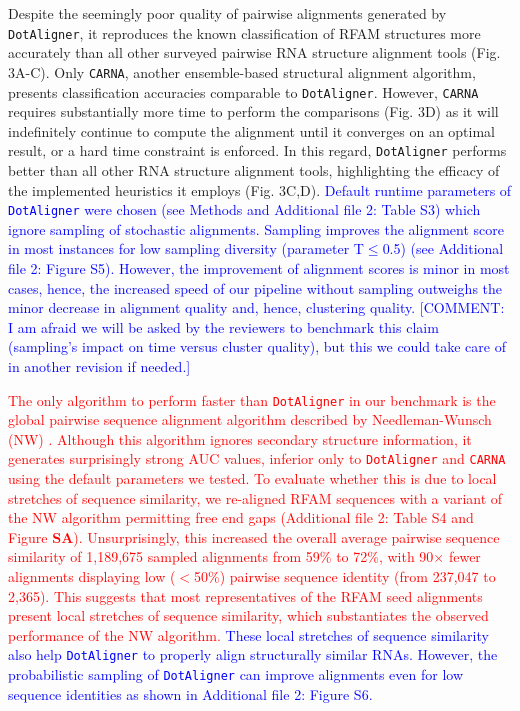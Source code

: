 \documentclass{bmcart}
\newcommand\dotaligner{\texttt{DotAligner}}
\newcommand\carna{\texttt{CARNA}}
\begin{document}
Despite the seemingly poor quality of pairwise alignments generated by \dotaligner{}, it 
reproduces the known classification of RFAM structures more accurately than all 
other surveyed pairwise RNA structure alignment tools (Fig. 3A-C). Only \carna{}, 
another ensemble-based structural alignment algorithm, presents classification accuracies
comparable to \dotaligner{}. However, \carna{} requires substantially more time to perform 
the comparisons (Fig. 3D) as it will indefinitely continue to compute the alignment
until it converges on an optimal result, or a hard time constraint is enforced.  
In this regard, \dotaligner{} performs better than all other RNA structure alignment tools, 
highlighting the efficacy of the implemented heuristics it employs (Fig. 3C,D). 
\textcolor{blue} {
Default runtime parameters of \dotaligner{} were chosen (see Methods and Additional file 2: Table
S3) which ignore sampling of stochastic alignments. Sampling
improves the alignment score in most instances for low sampling diversity
(parameter T$\le$0.5) (see Additional file 2: Figure S5). However, the
improvement of alignment scores is minor in most cases, hence, the increased speed of our
pipeline without sampling outweighs the minor decrease in alignment quality and, hence,
clustering quality. [COMMENT: I am afraid we will be asked by the reviewers
to benchmark this claim (sampling's impact on time versus cluster quality), but
this we could take care of in another revision if needed.] \\
}

\textcolor{red} {The only algorithm to perform faster than \dotaligner{} in our benchmark is the global pairwise 
sequence alignment algorithm described by Needleman-Wunsch (NW) \cite{needleman1970general}. 
Although this algorithm ignores secondary structure information, it generates surprisingly strong
AUC values, inferior only to \dotaligner{} and \carna{} using the default parameters we tested.  
To evaluate whether this is due to local stretches of sequence similarity, we re-aligned RFAM 
sequences with a variant of the NW algorithm permitting free end gaps (Additional file 2: Table S4 
and Figure \textbf{SA}).  
Unsurprisingly, this increased the overall average pairwise sequence similarity of 1,189,675 sampled 
alignments from 59\% to 72\%, with 90$\times$ fewer alignments displaying low ($<$50\%) pairwise 
sequence identity (from 237,047 to 2,365). This suggests that most representatives of  the RFAM 
seed alignments present local stretches of sequence similarity, which substantiates 
the observed performance of the NW algorithm.}
\textcolor{blue} {These local stretches of sequence similarity also help
\dotaligner{} to properly align structurally similar RNAs. However, the
probabilistic sampling of \dotaligner{} can improve alignments even for low
sequence identities as shown in Additional file 2: Figure S6.} \\
\end{document}

